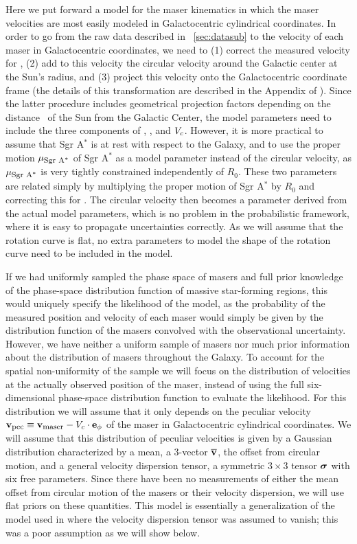 Here we put forward a model for the maser kinematics in which the
maser velocities are most easily modeled in Galactocentric cylindrical
coordinates. In order to go from the raw data described in
\sectionname~\ref{sec:datasub} to the velocity of each maser in
Galactocentric coordinates, we need to (1) correct the measured
velocity for \vsunlsr, (2) add to this velocity the circular velocity
around the Galactic center at the Sun's radius, and (3) project this
velocity onto the Galactocentric coordinate frame (the details of this
transformation are described in the Appendix of \reid). Since the
latter procedure includes geometrical projection factors depending on
the distance \Ro\ of the Sun from the Galactic Center, the model
parameters need to include the three components of \vsunlsr, \Ro, and
$V_c$. However, it is more practical to assume that Sgr A$^*$ is at
rest with respect to the Galaxy, and to use the proper motion
$\mu_{\mbox{{\footnotesize Sgr A$^*$}}}$ of Sgr A$^*$ \citep{Reid04a} as a model parameter instead of
the circular velocity, as $\mu_{\mbox{{\footnotesize Sgr A$^*$}}}$ is very tightly constrained
independently of $R_0$. These two parameters are related simply by
multiplying the proper motion of Sgr A$^*$ by $R_0$ and correcting
this for \vsunlsr. The circular velocity then becomes a parameter
derived from the actual model parameters, which is no problem in the
probabilistic framework, where it is easy to propagate uncertainties
correctly.  As we will assume that the rotation curve is flat, no
extra parameters to model the shape of the rotation curve need to be
included in the model.

If we had uniformly sampled the phase space of masers and full prior
knowledge of the phase-space distribution function of massive
star-forming regions, this would uniquely specify the likelihood of
the model, as the probability of the measured position and velocity of
each maser would simply be given by the distribution function of the
masers convolved with the observational uncertainty. However, we have
neither a uniform sample of masers nor much prior information about
the distribution of masers throughout the Galaxy. To account for the
spatial non-uniformity of the sample we will focus on the distribution
of velocities at the actually observed position of the maser, instead
of using the full six-dimensional phase-space distribution function to
evaluate the likelihood. For this distribution we will assume that it
only depends on the peculiar velocity $\boldsymbol{\mathbf{v}}_{\mbox{{\footnotesize pec}}} \equiv \boldsymbol{\mathbf{v}}_{\mbox{{\footnotesize maser}}} - V_c
\cdot \mathbf{e}_{\phi}$ of the maser in Galactocentric cylindrical
coordinates. We will assume that this distribution of peculiar
velocities is given by a Gaussian distribution characterized by a
mean, a 3-vector $\overline{\boldsymbol{\mathbf{v}}}$, the offset from circular motion, and a
general velocity dispersion tensor, a symmetric $3 \times 3$ tensor
$\mbox{\boldmath$\sigma$}$ with six free parameters. Since there have been no
measurements of either the mean offset from circular motion of the
masers or their velocity dispersion, we will use flat priors on these
quantities. This model is essentially a generalization of the model
used in \citet{Reid09a} where the velocity dispersion tensor was
assumed to vanish; this was a poor assumption as we will show below.

